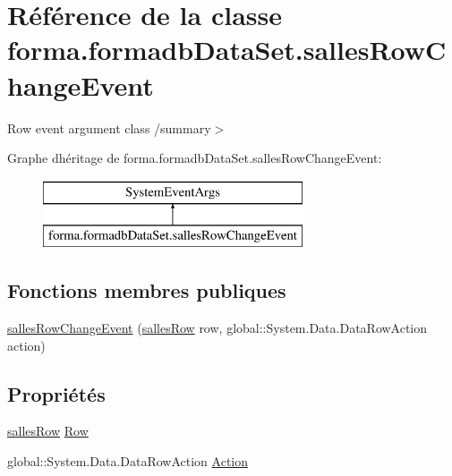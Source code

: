 \hypertarget{classforma_1_1formadb_data_set_1_1salles_row_change_event}{}\section{Référence de la classe forma.\+formadb\+Data\+Set.\+salles\+Row\+Change\+Event}
\label{classforma_1_1formadb_data_set_1_1salles_row_change_event}


Row event argument class /summary$>$  


Graphe d\textquotesingle{}héritage de forma.\+formadb\+Data\+Set.\+salles\+Row\+Change\+Event\+:\begin{figure}[H]
\begin{center}
\leavevmode
\includegraphics[height=2.000000cm]{classforma_1_1formadb_data_set_1_1salles_row_change_event}
\end{center}
\end{figure}
\subsection*{Fonctions membres publiques}
\begin{DoxyCompactItemize}
\item 
\hyperlink{classforma_1_1formadb_data_set_1_1salles_row_change_event_a149ec058ce08aa59e08506a7270ac129}{salles\+Row\+Change\+Event} (\hyperlink{classforma_1_1formadb_data_set_1_1salles_row}{salles\+Row} row, global\+::\+System.\+Data.\+Data\+Row\+Action action)
\end{DoxyCompactItemize}
\subsection*{Propriétés}
\begin{DoxyCompactItemize}
\item 
\hyperlink{classforma_1_1formadb_data_set_1_1salles_row}{salles\+Row} \hyperlink{classforma_1_1formadb_data_set_1_1salles_row_change_event_a9bfda47fe20d5bb0ddb990d2acc61bf6}{Row}
\item 
global\+::\+System.\+Data.\+Data\+Row\+Action \hyperlink{classforma_1_1formadb_data_set_1_1salles_row_change_event_ac5240d4248e666b82a03f538a37b0e0f}{Action}
\end{DoxyCompactItemize}


